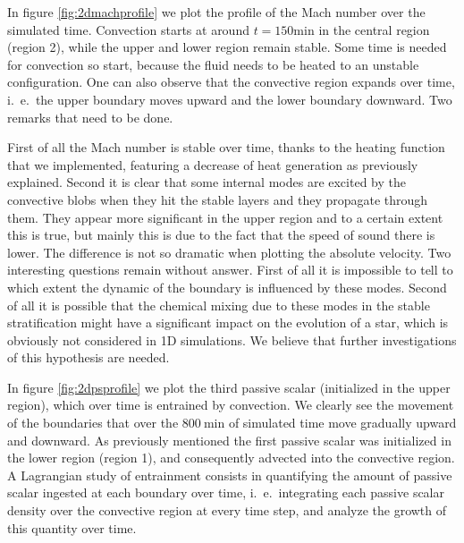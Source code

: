 In figure \ref{fig:2dmachprofile} we plot the profile of the Mach number over the simulated time. Convection starts at around $t=150 \mathrm{min}$ in the central region (region 2), while the upper and lower region remain stable. Some time is needed for convection so start, because the fluid needs to be heated to an unstable configuration. One can also observe that the convective region expands over time, i.\ e.\ the upper boundary moves upward and the lower boundary downward. Two remarks that need to be done. 

First of all the Mach number is stable over time, thanks to the heating function that we implemented, featuring a decrease of heat generation as previously explained. 
Second it is clear that some internal modes are excited by the convective blobs when they hit the stable layers and they propagate through them. They appear more significant in the upper region and to a certain extent this is true, but mainly this is due to the fact that the speed of sound there is lower. The difference is not so dramatic when plotting the absolute velocity. Two interesting questions remain without answer. First of all it is impossible to tell to which extent the dynamic of the boundary is influenced by these modes. Second of all it is possible that the chemical mixing due to these modes in the stable stratification might have a significant impact on the evolution of a star, which is obviously not considered in 1D simulations. We believe that further investigations of this hypothesis are needed.

  In figure \ref{fig:2dpsprofile} we plot the third passive scalar (initialized in the upper region), which over time is entrained by convection. We clearly see the movement of the boundaries that over the $800 \ \mathrm{min}$ of simulated time move gradually upward and downward. As previously mentioned the first passive scalar was initialized in the lower region (region 1), and consequently advected into the convective region. A Lagrangian study of entrainment consists in quantifying the amount of passive scalar ingested at each boundary over time, i.\ e.\ integrating each passive scalar density over the convective region at every time step, and analyze the growth of this quantity over time.

